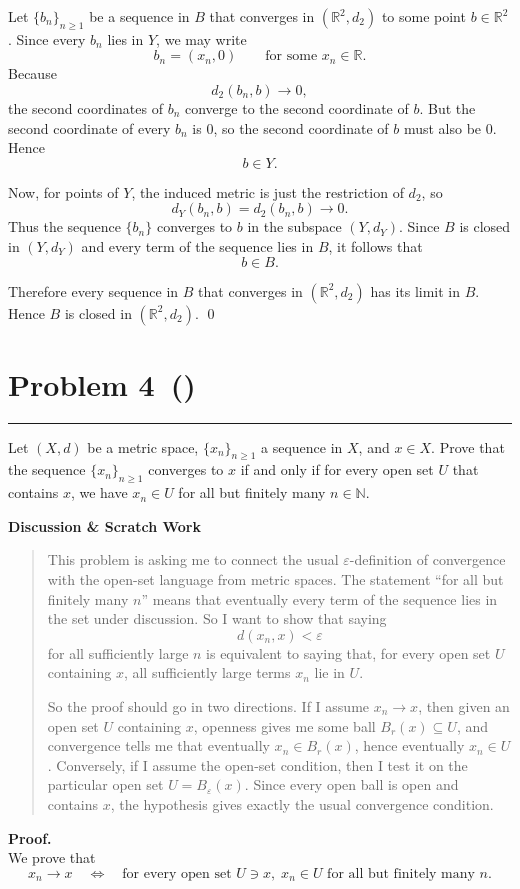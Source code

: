 \documentclass[12pt]{article}
\makeatletter
\newenvironment{scratch}{%
  \par\smallskip
  \noindent\textbf{Discussion \& Scratch Work}\begin{quote}\small
}{%
  \end{quote}\smallskip
}
\newcommand{\problem}[2][]{%
  \def\prob@title{Problem #2\if\relax\detokenize{#1}\relax\else\ (\textit{#1})\fi}%
  \phantomsection%
  \pdfbookmark[1]{\prob@title}{prob#2}%
  \addcontentsline{toc}{section}{\prob@title}%
  \section*{\prob@title}%
  \vspace{-0.25em}\hrule\vspace{0.8em}%
}
\makeatother
\begin{document}
Let $\{b_n\}_{n\ge 1}$ be a sequence in $B$ that converges in $(\mathbb{R}^2,d_2)$ to some point $b\in\mathbb{R}^2$. Since every $b_n$ lies in $Y$, we may write
\[
b_n=(x_n,0)
\qquad \text{for some } x_n\in\mathbb{R}.
\]
Because
\[
d_2(b_n,b)\to 0,
\]
the second coordinates of $b_n$ converge to the second coordinate of $b$. But the second coordinate of every $b_n$ is $0$, so the second coordinate of $b$ must also be $0$. Hence
\[
b\in Y.
\]

Now, for points of $Y$, the induced metric is just the restriction of $d_2$, so
\[
d_Y(b_n,b)=d_2(b_n,b) \to 0.
\]
Thus the sequence $\{b_n\}$ converges to $b$ in the subspace $(Y,d_Y)$. Since $B$ is closed in $(Y,d_Y)$ and every term of the sequence lies in $B$, it follows that
\[
b\in B.
\]

Therefore every sequence in $B$ that converges in $(\mathbb{R}^2,d_2)$ has its limit in $B$. Hence $B$ is closed in $(\mathbb{R}^2,d_2)$.
\qed

\newpage

\problem[]{4}
Let $(X,d)$ be a metric space, $\{x_n\}_{n\ge 1}$ a sequence in $X$, and
$x\in X$. Prove that the sequence $\{x_n\}_{n\ge 1}$ converges to $x$ if and
only if for every open set $U$ that contains $x$, we have $x_n\in U$ for all
but finitely many $n\in\mathbb{N}$.

\begin{scratch}
This problem is asking me to connect the usual $\varepsilon$-definition of convergence with the open-set language from metric spaces. The statement ``for all but finitely many $n$'' means that eventually every term of the sequence lies in the set under discussion. So I want to show that saying
\[
d(x_n,x)<\varepsilon
\]
for all sufficiently large $n$ is equivalent to saying that, for every open set $U$ containing $x$, all sufficiently large terms $x_n$ lie in $U$.

So the proof should go in two directions. If I assume $x_n\to x$, then given an open set $U$ containing $x$, openness gives me some ball $B_r(x)\subseteq U$, and convergence tells me that eventually $x_n\in B_r(x)$, hence eventually $x_n\in U$. Conversely, if I assume the open-set condition, then I test it on the particular open set $U=B_\varepsilon(x)$. Since every open ball is open and contains $x$, the hypothesis gives exactly the usual convergence condition.
\end{scratch}

\textbf{Proof.}\\
We prove that
\[
x_n\to x
\quad\Longleftrightarrow\quad
\text{for every open set } U\ni x,\; x_n\in U \text{ for all but finitely many } n.
\]
\end{document}
